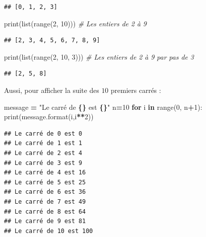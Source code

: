 \documentclass[
  12pt,
]{book}
\newenvironment{Shaded}{\begin{snugshade}}{\end{snugshade}}
\newcommand{\BuiltInTok}[1]{#1}
\newcommand{\CommentTok}[1]{\textcolor[rgb]{0.56,0.35,0.01}{\textit{#1}}}
\newcommand{\ControlFlowTok}[1]{\textcolor[rgb]{0.13,0.29,0.53}{\textbf{#1}}}
\newcommand{\DecValTok}[1]{\textcolor[rgb]{0.00,0.00,0.81}{#1}}
\newcommand{\KeywordTok}[1]{\textcolor[rgb]{0.13,0.29,0.53}{\textbf{#1}}}
\newcommand{\NormalTok}[1]{#1}
\newcommand{\OperatorTok}[1]{\textcolor[rgb]{0.81,0.36,0.00}{\textbf{#1}}}
\newcommand{\SpecialCharTok}[1]{\textcolor[rgb]{0.81,0.36,0.00}{\textbf{#1}}}
\newcommand{\StringTok}[1]{\textcolor[rgb]{0.31,0.60,0.02}{#1}}
\numberwithin{equation}{section}
\numberwithin{countremarque}{section}
\begin{document}
\begin{lstlisting}
## [0, 1, 2, 3]
\end{lstlisting}

\begin{Shaded}
\begin{Highlighting}[]
\BuiltInTok{print}\NormalTok{(}\BuiltInTok{list}\NormalTok{(}\BuiltInTok{range}\NormalTok{(}\DecValTok{2}\NormalTok{, }\DecValTok{10}\NormalTok{))) }\CommentTok{\# Les entiers de 2 à 9}
\end{Highlighting}
\end{Shaded}

\begin{lstlisting}
## [2, 3, 4, 5, 6, 7, 8, 9]
\end{lstlisting}

\begin{Shaded}
\begin{Highlighting}[]
\BuiltInTok{print}\NormalTok{(}\BuiltInTok{list}\NormalTok{(}\BuiltInTok{range}\NormalTok{(}\DecValTok{2}\NormalTok{, }\DecValTok{10}\NormalTok{, }\DecValTok{3}\NormalTok{))) }\CommentTok{\# Les entiers de 2 à 9 par pas de 3}
\end{Highlighting}
\end{Shaded}

\begin{lstlisting}
## [2, 5, 8]
\end{lstlisting}

Aussi, pour afficher la suite des \(10\) premiers carrés :

\begin{Shaded}
\begin{Highlighting}[]
\NormalTok{message }\OperatorTok{=} \StringTok{"Le carré de }\SpecialCharTok{\{\}}\StringTok{ est }\SpecialCharTok{\{\}}\StringTok{"} 
\NormalTok{n}\OperatorTok{=}\DecValTok{10}
\ControlFlowTok{for}\NormalTok{ i }\KeywordTok{in} \BuiltInTok{range}\NormalTok{(}\DecValTok{0}\NormalTok{, n}\OperatorTok{+}\DecValTok{1}\NormalTok{):}
  \BuiltInTok{print}\NormalTok{(message.}\BuiltInTok{format}\NormalTok{(i,i}\OperatorTok{**}\DecValTok{2}\NormalTok{))}
\end{Highlighting}
\end{Shaded}

\begin{lstlisting}
## Le carré de 0 est 0
## Le carré de 1 est 1
## Le carré de 2 est 4
## Le carré de 3 est 9
## Le carré de 4 est 16
## Le carré de 5 est 25
## Le carré de 6 est 36
## Le carré de 7 est 49
## Le carré de 8 est 64
## Le carré de 9 est 81
## Le carré de 10 est 100
\end{lstlisting}
\end{document}
